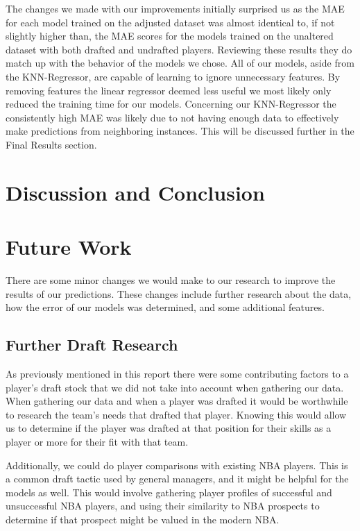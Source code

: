 \documentclass{article}
\begin{document}
The changes we made with our improvements initially surprised us as the MAE for
each model trained on the adjusted dataset was almost identical to, if not
slightly higher than, the MAE scores for the models trained on the unaltered
dataset with both drafted and undrafted players. Reviewing these results they do
match up with the behavior of the models we chose. All of our models, aside from
the KNN-Regressor, are capable of learning to ignore unnecessary features. By
removing features the linear regressor deemed less useful we most likely only
reduced the training time for our models. Concerning our KNN-Regressor the
consistently high MAE was likely due to not having enough data to effectively
make predictions from neighboring instances. This will be discussed further in
the Final Results section.

\section{Discussion and Conclusion}



\section{Future Work}

There are some minor changes we would make to our research to improve the
results of our predictions. These changes include further research about the
data, how the error of our models was determined, and some additional features.

\subsection{Further Draft Research}

As previously mentioned in this report there were some contributing factors to a
player’s draft stock that we did not take into account when gathering our data.
When gathering our data and when a player was drafted it would be worthwhile to
research the team’s needs that drafted that player. Knowing this would allow us
to determine if the player was drafted at that position for their skills as a
player or more for their fit with that team. 

Additionally, we could do player comparisons with existing NBA players. This is
a common draft tactic used by general managers, and it might be helpful for the
models as well. This would involve gathering player profiles of successful and
unsuccessful NBA players, and using their similarity to NBA prospects to
determine if that prospect might be valued in the modern NBA.
\end{document}
